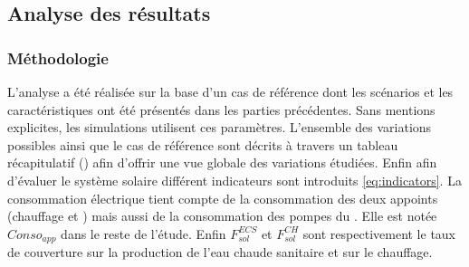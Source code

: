\subsection{Analyse des résultats} %
\label{sub:analyse_des_resultats}
\subsubsection{Méthodologie} %
\label{ssub:methodologie}
L’analyse a été réalisée sur la base d’un cas de référence dont les scénarios et les
caractéristiques ont été présentés dans les parties précédentes. Sans mentions explicites, les
simulations utilisent ces paramètres. L’ensemble des variations possibles ainsi que
le cas de référence sont décrits à travers un tableau récapitulatif ()
afin d’offrir une vue globale des variations étudiées.
Enfin afin d’évaluer le système solaire différent indicateurs sont introduits
\eqref{eq:indicators}. La consommation électrique tient compte de la consommation des deux
appoints (chauffage et ) mais aussi de la consommation des pompes du . Elle est
notée $Conso_{app}$ dans le reste de l’étude. Enfin $F_{sol}^{ECS}$ et $F_{sol}^{CH}$
sont respectivement le taux de couverture sur la production de l’eau chaude sanitaire
et sur le chauffage.

